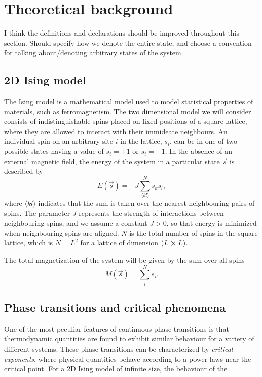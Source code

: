 \section{Theoretical background}\label{sec:theory}
\alert{I think the definitions and declarations should be improved throughout this section. Should specify how we denote the entire state, and choose a convention for talking about/denoting arbitrary states of the system.}
\subsection{2D Ising model}\label{subsec_theory:ising_2d}
The Ising model is a mathematical model used to model statistical properties of materials, such as ferromagnetism. The two dimensional model we will consider consists of indistinguishable spins  placed on fixed positions of a square lattice, where they are allowed to interact with their immideate neighbours. An individual spin on an arbitrary site $i$ in the lattice, $s_i$, can be in one of two possible states having a value of $s_i=+1$ or $s_i=-1$. In the absence of an external magnetic field, the energy of the system in a particular state $\vec{s}$ is described by  
\begin{equation} \label{eq:energy}
    E(\vec{s}) = -J \sum_{\langle kl \rangle}^N s_k s_l,
\end{equation}
where $\langle kl\rangle$ indicates that the sum is taken over the nearest neighbouring pairs of spins.  The parameter $J$ represents the strength of interactions between neighbouring spins, and we assume a constant $J>0$, so that energy is minimized when neighbouring spins are aligned. $N$ is the total number of spins in the square lattice, which is $N=L^2$ for a lattice of dimension $(L\cross L)$.

The total magnetization of the system will be given by the sum over all spins 
\begin{equation}\label{eq:total_magnetization}
    M(\vec{s}) = \sum_{i}^N s_i.
\end{equation}

\subsection{Phase transitions and critical phenomena}\label{subsec_theory:PT_critical_phenomena}
One of the most peculiar features of continuous phase transitions is that thermodynamic quantities are found to exhibit similar behaviour for a variety of different systems. These phase transitions can be characterized by \textit{critical exponents}, where physical quantities behave according to a power laws near the critical point.  For a 2D Ising model of infinite size, the behaviour of the 

